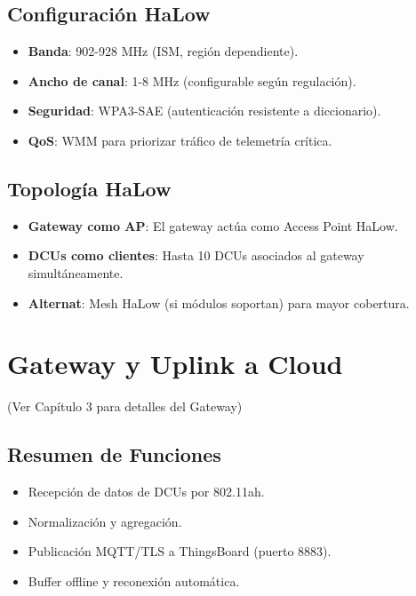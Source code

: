\subsection{Configuración HaLow}

\begin{itemize}
    \item \textbf{Banda}: 902-928 MHz (ISM, región dependiente).
    \item \textbf{Ancho de canal}: 1-8 MHz (configurable según regulación).
    \item \textbf{Seguridad}: WPA3-SAE (autenticación resistente a diccionario).
    \item \textbf{QoS}: WMM para priorizar tráfico de telemetría crítica.
\end{itemize}

\subsection{Topología HaLow}

\begin{itemize}
    \item \textbf{Gateway como AP}: El gateway actúa como Access Point HaLow.
    \item \textbf{DCUs como clientes}: Hasta 10 DCUs asociados al gateway simultáneamente.
    \item \textbf{Alternat}: Mesh HaLow (si módulos soportan) para mayor cobertura.
\end{itemize}

\section{Gateway y Uplink a Cloud}

(Ver Capítulo 3 para detalles del Gateway)

\subsection{Resumen de Funciones}

\begin{itemize}
    \item Recepción de datos de DCUs por 802.11ah.
    \item Normalización y agregación.
    \item Publicación MQTT/TLS a ThingsBoard (puerto 8883).
    \item Buffer offline y reconexión automática.
\end{itemize}

